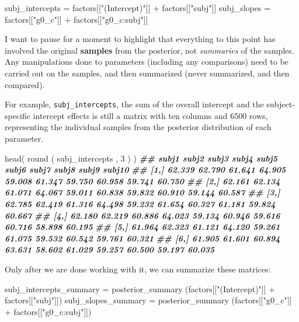 \documentclass[
]{book}
\newenvironment{Shaded}{\begin{snugshade}}{\end{snugshade}}
\newcommand{\DecValTok}[1]{\textcolor[rgb]{0.00,0.00,0.81}{#1}}
\newcommand{\DocumentationTok}[1]{\textcolor[rgb]{0.56,0.35,0.01}{\textbf{\textit{#1}}}}
\newcommand{\FunctionTok}[1]{\textcolor[rgb]{0.00,0.00,0.00}{#1}}
\newcommand{\NormalTok}[1]{#1}
\newcommand{\OtherTok}[1]{\textcolor[rgb]{0.56,0.35,0.01}{#1}}
\newcommand{\SpecialCharTok}[1]{\textcolor[rgb]{0.00,0.00,0.00}{#1}}
\newcommand{\StringTok}[1]{\textcolor[rgb]{0.31,0.60,0.02}{#1}}
\begin{document}
\begin{Shaded}
\begin{Highlighting}[]
\NormalTok{subj\_intercepts }\OtherTok{=}\NormalTok{ factors[[}\StringTok{"(Intercept)"}\NormalTok{]] }\SpecialCharTok{+}\NormalTok{ factors[[}\StringTok{"subj"}\NormalTok{]]}
\NormalTok{subj\_slopes }\OtherTok{=}\NormalTok{ factors[[}\StringTok{"g0\_c"}\NormalTok{]] }\SpecialCharTok{+}\NormalTok{ factors[[}\StringTok{"g0\_c:subj"}\NormalTok{]]}
\end{Highlighting}
\end{Shaded}

I want to pause for a moment to highlight that everything to this point has involved the original \textbf{samples} from the posterior, not \emph{summaries} of the samples. Any manipulations done to parameters (including any comparisons) need to be carried out on the samples, and then summarized (never summarized, and then compared).

For example, \texttt{subj\_intercepts}, the sum of the overall intercept and the subject-specific intercept effects is still a matrix with ten columns and 6500 rows, representing the individual samples from the posterior distribution of each parameter.

\begin{Shaded}
\begin{Highlighting}[]
\FunctionTok{head}\NormalTok{( }\FunctionTok{round}\NormalTok{ ( subj\_intercepts , }\DecValTok{3}\NormalTok{ ) )}
\DocumentationTok{\#\#       subj1  subj2  subj3  subj4  subj5  subj6  subj7  subj8  subj9 subj10}
\DocumentationTok{\#\# [1,] 62.339 62.790 61.641 64.905 59.008 61.347 59.750 60.958 59.741 60.750}
\DocumentationTok{\#\# [2,] 62.161 62.134 61.071 64.067 59.011 60.838 59.832 60.910 59.144 60.587}
\DocumentationTok{\#\# [3,] 62.785 62.419 61.316 64.498 59.232 61.654 60.327 61.181 59.824 60.667}
\DocumentationTok{\#\# [4,] 62.180 62.219 60.886 64.023 59.134 60.946 59.616 60.716 58.898 60.195}
\DocumentationTok{\#\# [5,] 61.964 62.323 61.121 64.120 59.261 61.075 59.532 60.542 59.761 60.321}
\DocumentationTok{\#\# [6,] 61.905 61.601 60.894 63.631 58.602 61.029 59.257 60.500 59.197 60.035}
\end{Highlighting}
\end{Shaded}

Only after we are done working with it, we can summarize these matrices:

\begin{Shaded}
\begin{Highlighting}[]
\NormalTok{subj\_intercepts\_summary }\OtherTok{=} \FunctionTok{posterior\_summary}\NormalTok{ (factors[[}\StringTok{"(Intercept)"}\NormalTok{]] }\SpecialCharTok{+}\NormalTok{ factors[[}\StringTok{"subj"}\NormalTok{]])}
\NormalTok{subj\_slopes\_summary }\OtherTok{=} \FunctionTok{posterior\_summary}\NormalTok{ (factors[[}\StringTok{"g0\_c"}\NormalTok{]] }\SpecialCharTok{+}\NormalTok{ factors[[}\StringTok{"g0\_c:subj"}\NormalTok{]])}
\end{Highlighting}
\end{Shaded}
\end{document}
